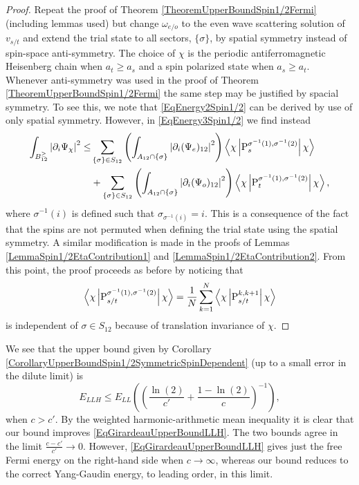 \begin{proof}
	Repeat the proof of Theorem \ref{TheoremUpperBoundSpin1/2Fermi} (including lemmas used) but change $ \omega_{e/o} $ to the even wave scattering solution of $ v_{s/t} $ and extend the trial state to all sectors, $ \{\sigma\} $, by spatial symmetry instead of spin-space anti-symmetry. The choice of $ \chi $ is the periodic antiferromagnetic Heisenberg chain when $ a_t\geq a_s $ and a spin polarized state when $ a_s\geq a_t $.
	Whenever anti-symmetry was used in the proof of Theorem \ref{TheoremUpperBoundSpin1/2Fermi} the same step may be justified by spacial symmetry. To see this, we note that \eqref{EqEnergy2Spin1/2} can be derived by use of only spatial symmetry. However, in \eqref{EqEnergy3Spin1/2} we find instead
	\begin{equation}
	\begin{aligned}
	\int_{B_{12}^{\geq}}\left\lvert \partial_i\Psi_{\chi} \right\rvert^2\leq&\sum_{\{\sigma\}\in S_{12}}\left(\int_{A_{12}\cap\{\sigma\}}\left\lvert \partial_i(\Psi_e)_{12} \right\rvert^2\right)\left\langle\chi \left\lvert \operatorname{P}^{\sigma^{-1}(1),\sigma^{-1}(2)}_s  \right\rvert \chi\right\rangle\\
	&+\sum_{\{\sigma\}\in S_{12}}\left(\int_{A_{12}\cap \{\sigma\}}\left\lvert \partial_i(\Psi_o)_{12} \right\rvert^2\right)\left\langle\chi \left\lvert \operatorname{P}^{\sigma^{-1}(1),\sigma^{-1}(2)}_t  \right\rvert \chi\right\rangle,
	\end{aligned}
	\end{equation}
	where $ \sigma^{-1}(i) $ is defined such that $ \sigma_{\sigma^{-1}(i)}=i $. This is a consequence of the fact that the spins are not permuted when defining the trial state using the spatial symmetry. A similar modification is made in the proofs of Lemmas \ref{LemmaSpin1/2EtaContribution1} and \ref{LemmaSpin1/2EtaContribution2}. From this point, the proof proceeds as before by noticing that 
	$$ \left\langle\chi \left\lvert \operatorname{P}^{\sigma^{-1}(1),\sigma^{-1}(2)}_{s/t}  \right\rvert \chi\right\rangle=\frac{1}{N}\sum_{k=1}^{N}\left\langle\chi \left\lvert \operatorname{P}^{k,k+1}_{s/t}  \right\rvert \chi\right\rangle $$
	is independent of $ \sigma\in S_{12} $ because of translation invariance of $ \chi $.
\end{proof}
We see that the upper bound given by Corollary \ref{CorollaryUpperBoundSpin1/2SymmetricSpinDependent} (up to a small error in the dilute limit) is \begin{equation}
E_{LLH}\leq E_{LL}\left(\left(\frac{\ln(2)}{c'}+\frac{1-\ln(2)}{c}\right)^{-1}\right),
\end{equation}
when $ c>c' $. By the weighted harmonic-arithmetic mean inequality it is clear that our bound improves \eqref{EqGirardeauUpperBoundLLH}. The two bounds agree in the limit $ \frac{c-c'}{c'}\to0 $. However, \eqref{EqGirardeauUpperBoundLLH} gives just the free Fermi energy on the right-hand side when $ c\to\infty $, whereas our bound reduces to the correct Yang-Gaudin energy, to leading order, in this limit.
